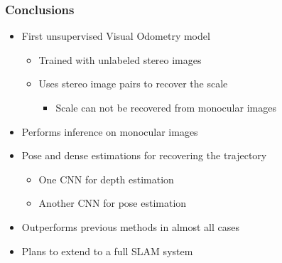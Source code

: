 \begin{frame}
    \frametitle{Conclusions}
    \begin{itemize}
        \item First unsupervised Visual Odometry model
        \begin{itemize}
            \item Trained with unlabeled stereo images
            \item Uses stereo image pairs to recover the scale
            \begin{itemize}
                \item Scale can not be recovered from monocular images
            \end{itemize}
        \end{itemize}
        \item Performs inference on monocular images
        \item Pose and dense estimations for recovering the trajectory
            \begin{itemize}
                \item One CNN for depth estimation
                \item Another CNN for pose estimation
            \end{itemize}
        \item Outperforms previous methods in almost all cases
        \item Plans to extend to a full SLAM system
    \end{itemize}
\end{frame}
